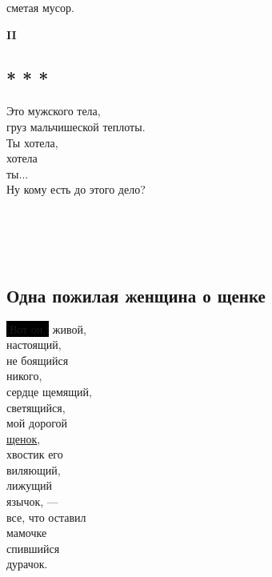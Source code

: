 \documentclass[12pt,a5paper]{report}
\newcommand{\hl}[1]{\colorbox{black}{#1}} %
\begin{document}
сметая мусор.

\newpage
\textbf{II}\\

\subsection[<<Это тяжесть мужского тела...>>]{* * *}
Это \raisebox{-2pt}{тяжесть} мужского тела, \\
груз мальчишеской теплоты. \\

Ты хотела, \\
хотела \\
ты... \\

Ну кому есть до этого дело?\\

\colorbox{lightgray}{\phantom{груз мальчишеской теплоты}} \\

\colorbox{lightgray}{\phantom{Ты хотела,}}\\
\colorbox{lightgray}{\phantom{хотела}}\\
\colorbox{lightgray}{\phantom{ты...}}\\

\newpage
\subsection{Одна пожилая женщина о щенке}
\label{schenok}

\hl{[Вот он,]} живой,\\
настоящий,\\
не боящийся\\
никого,\\

сердце щемящий,\\
светящийся,\\
мой дорогой\\
\hyperref[schenki]{щенок},\\

хвостик его\\
виляющий,\\
лижущий\\
язычок, ---\\

все, что оставил\\
мамочке\\
спившийся\\
дурачок.
\end{document}
